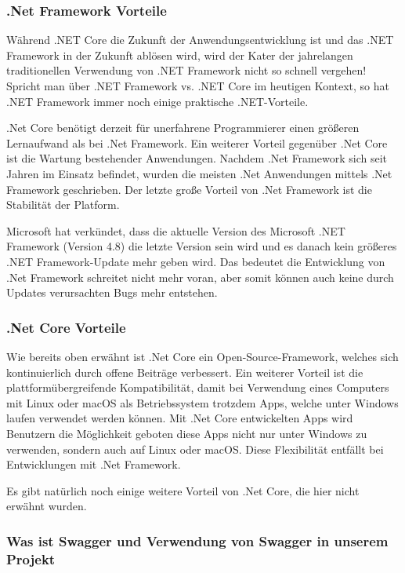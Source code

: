 \subsubsection*{.Net Framework Vorteile}
Während .NET Core die Zukunft der Anwendungsentwicklung ist und das .NET Framework in der Zukunft ablösen wird, wird der Kater der jahrelangen traditionellen Verwendung von .NET Framework nicht so schnell vergehen!
Spricht man über .NET Framework vs. .NET Core im heutigen Kontext, so hat .NET Framework immer noch einige praktische .NET-Vorteile.

.Net Core benötigt derzeit für unerfahrene Programmierer einen größeren Lernaufwand als bei .Net Framework. 
Ein weiterer Vorteil gegenüber .Net Core ist die Wartung bestehender Anwendungen. 
Nachdem .Net Framework sich seit Jahren im Einsatz befindet, wurden die meisten .Net Anwendungen mittels .Net Framework geschrieben. 
Der letzte große Vorteil von .Net Framework ist die Stabilität der Platform. 

Microsoft hat verkündet, dass die aktuelle Version des Microsoft .NET Framework (Version 4.8) die letzte Version sein wird und es danach kein größeres .NET Framework-Update mehr geben wird.
Das bedeutet die Entwicklung von .Net Framework schreitet nicht mehr voran, aber somit können auch keine durch Updates verursachten Bugs mehr entstehen.

\subsubsection*{.Net Core Vorteile}

Wie bereits oben erwähnt ist .Net Core ein Open-Source-Framework, welches sich kontinuierlich durch offene Beiträge verbessert.
Ein weiterer Vorteil ist die plattformübergreifende Kompatibilität, damit bei Verwendung eines Computers mit Linux oder macOS als Betriebssystem trotzdem Apps, welche unter Windows laufen verwendet werden können.
Mit .Net Core entwickelten Apps wird Benutzern die Möglichkeit geboten diese Apps nicht nur unter Windows zu verwenden, sondern auch auf Linux oder macOS. Diese Flexibilität entfällt bei Entwicklungen mit .Net Framework.

Es gibt natürlich noch einige weitere Vorteil von .Net Core, die hier nicht erwähnt wurden.


\subsubsection*{Was ist Swagger und Verwendung von Swagger in unserem Projekt}

